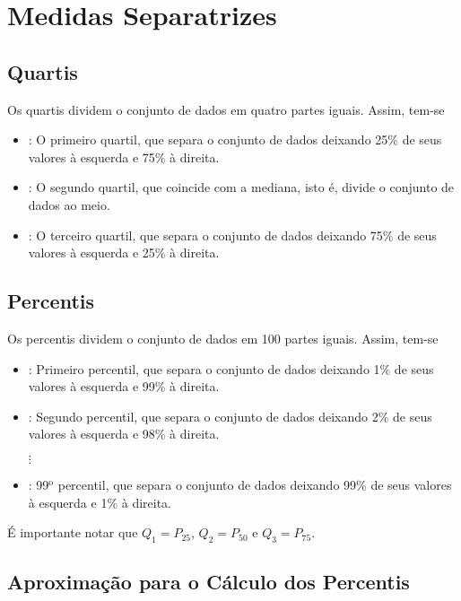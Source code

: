 \documentclass[11pt,fleqn]{book}
\numberwithin{mpicture}{chapter}
\numberwithin{mtable}{chapter}
\numberwithin{mframe}{chapter}
\begin{document}
\section{Medidas Separatrizes}

\subsection{Quartis}

Os quartis dividem o conjunto de dados em quatro partes iguais. Assim, tem-se
\begin{itemize}
	\item {}: O primeiro quartil, que separa o conjunto de dados deixando 25\% de seus valores à esquerda e 75\% à direita.
	\item {}: O segundo quartil, que coincide com a mediana, isto é, divide o conjunto de dados ao meio.
	\item {}: O terceiro quartil, que separa o conjunto de dados deixando 75\% de seus valores à esquerda e 25\% à direita.
\end{itemize}

\subsection{Percentis}

Os percentis dividem o conjunto de dados em 100 partes iguais. Assim, tem-se
\begin{itemize}
	\item {}: Primeiro percentil, que separa o conjunto de dados deixando 1\% de seus valores à esquerda e 99\% à direita.
	\item {}: Segundo percentil, que separa o conjunto de dados deixando 2\% de seus valores à esquerda e 98\% à direita.
	\begin{center}
		$\vdots$
	\end{center}
	\item {}: 99$^{\text{o}}$ percentil, que separa o conjunto de dados deixando 99\% de seus valores à esquerda e 1\% à direita.
\end{itemize}

\begin{remark}
	É importante notar que $Q_1=P_{25}$, $Q_2=P_{50}$ e $Q_3=P_{75}$.
\end{remark}

\subsection{Aproximação para o Cálculo dos Percentis}
\end{document}
